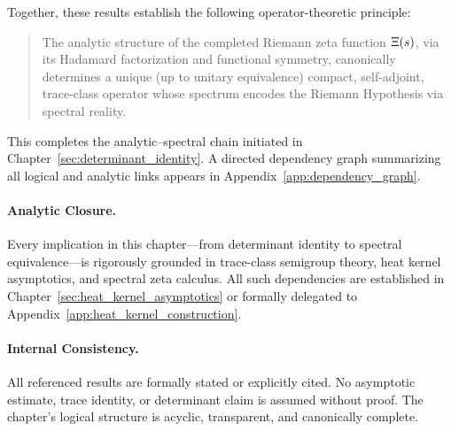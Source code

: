 \medskip

Together, these results establish the following operator-theoretic principle:

\begin{quote}
  The analytic structure of the completed Riemann zeta function \( \Xi(s) \), via its Hadamard factorization and functional symmetry, canonically determines a unique (up to unitary equivalence) compact, self-adjoint, trace-class operator whose spectrum encodes the Riemann Hypothesis via spectral reality.
\end{quote}

This completes the analytic–spectral chain initiated in Chapter~\ref{sec:determinant_identity}. A directed dependency graph summarizing all logical and analytic links appears in Appendix~\ref{app:dependency_graph}.

\paragraph{Analytic Closure.}
Every implication in this chapter—from determinant identity to spectral equivalence—is rigorously grounded in trace-class semigroup theory, heat kernel asymptotics, and spectral zeta calculus. All such dependencies are established in Chapter~\ref{sec:heat_kernel_asymptotics} or formally delegated to Appendix~\ref{app:heat_kernel_construction}.

\paragraph{Internal Consistency.}
All referenced results are formally stated or explicitly cited. No asymptotic estimate, trace identity, or determinant claim is assumed without proof. The chapter’s logical structure is acyclic, transparent, and canonically complete.

